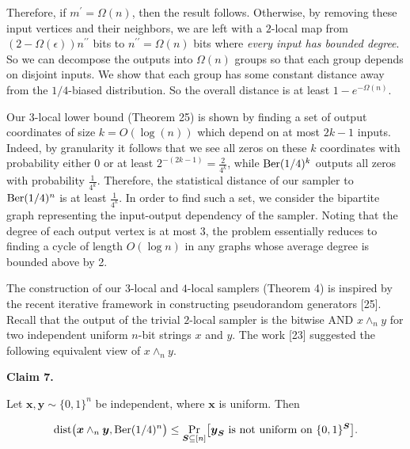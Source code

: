 Therefore, if $m^{\prime}=\Omega(n)$, then the result follows.
Otherwise, by removing these input vertices and their neighbors, we are left with a $2$-local map from $(2-\Omega(\epsilon))n^{\prime\prime}$ bits to $n^{\prime\prime}=\Omega(n)$ bits where \emph{every input has bounded degree}.
So we can decompose the outputs into $\Omega(n)$ groups so that each group depends on disjoint inputs.
We show that each group has some constant distance away from the $1/4$-biased distribution.
So the overall distance is at least $1-e^{-\Omega(n)}$.\par




Our 3-local lower bound (Theorem 25) is shown by finding a set of output coordinates of size $k=O(\log(n))$ which depend on at most $2k-1$ inputs. Indeed, by granularity it follows that we see all zeros on these $k$ coordinates with probability either 0 or at least $2^{-(2k-1)}=\frac{2}{4^{k}}$, while $\textnormal{Ber}(1/4)^{k}$ outputs all zeros with probability $\frac{1}{4^{k}}$. Therefore, the statistical distance of our sampler to $\textnormal{Ber}(1/4)^{n}$ is at least $\frac{1}{4^{k}}$. In order to find such a set, we consider the bipartite graph representing the input-output dependency of the sampler. Noting that the degree of each output vertex is at most 3, the problem essentially reduces to finding a cycle of length $O(\log n)$ in any graphs whose average degree is bounded above by 2.\par




The construction of our $3$-local and $4$-local samplers (Theorem 4) is inspired by the recent iterative framework in constructing pseudorandom generators [25].
Recall that the output of the trivial $2$-local sampler is the bitwise AND $x\wedge_{n}y$ for two independent uniform $n$-bit strings $x$ and $y$.
The work [23] suggested the following equivalent view of $x\wedge_{n}y$.\par





\par\medskip\noindent\textbf{
Claim 7. 
}\par



Let $\boldsymbol{x},\boldsymbol{y}\sim\{0,1\}^{n}$ be independent, where $\boldsymbol{x}$ is uniform.
Then\par


\[\begin{gathered}
\mathrm{dist}\bigl(\boldsymbol{x}\wedge_{n}\boldsymbol{y},\textnormal{Ber}(1/4)^{n}\bigr)\leq\Pr_{\boldsymbol{S}\subseteq[n]}\bigl[\text{$\boldsymbol{y}_{\boldsymbol{S}}$ is not uniform on $\{0,1\}^{\boldsymbol{S}}$}\bigr].
\end{gathered}\]



